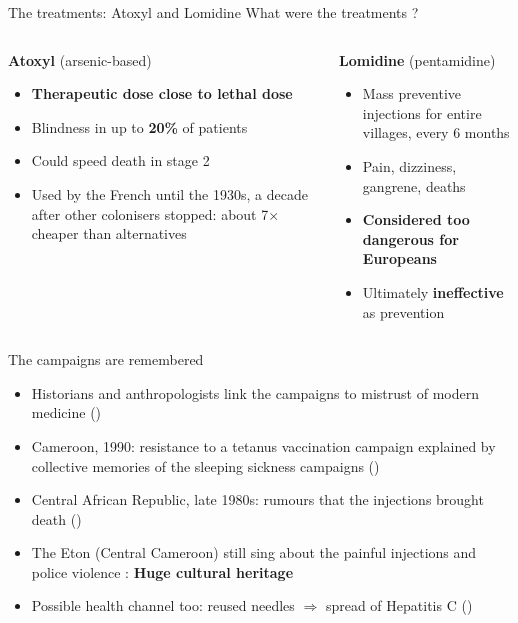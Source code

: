 \documentclass[aspectratio=1610]{beamer}
\newcommand{\highlight}[1]{\textcolor{accent}{\textbf{#1}}}
\newcommand{\refs}[1]{{\footnotesize\color{softgray}(\citealp{#1})}} %
\newcommand{\backupbutton}[2]{\hyperlink{#1}{\beamergotobutton{#2}}}
\begin{document}
\begin{frame}{The treatments: Atoxyl and Lomidine}
\centering
What were the treatments ?
  \begin{columns}[T]
    \begin{column}{0.48\textwidth}
      \textbf{Atoxyl} (arsenic-based)
      \begin{itemize}
        \item \highlight{Therapeutic dose close to lethal dose}
        \item Blindness in up to \highlight{20\%} of patients
        \item Could speed death in stage 2
        \item Used by the French until the 1930s, a decade after other colonisers stopped:
          about 7$\times$ cheaper than alternatives
      \end{itemize}
    \end{column}
    \begin{column}{0.48\textwidth}
      \textbf{Lomidine} (pentamidine)
      \begin{itemize}
        \item Mass preventive injections for entire villages, every 6 months
        \item Pain, dizziness, gangrene, deaths
        \item \highlight{Considered too dangerous for Europeans}
        \item Ultimately \highlight{ineffective} as prevention
      \end{itemize}
    \end{column}
  \end{columns}
\end{frame}

\begin{frame}[label=main-memory]{The campaigns are remembered}
  \begin{itemize}
    \item Historians and anthropologists link the campaigns to mistrust of modern medicine
      \refs{headrick_1994,lachenal_2014}
    \item Cameroon, 1990: resistance to a tetanus vaccination campaign explained by
      collective memories of the sleeping sickness campaigns \refs{feldman_etal_2000}
    \item Central African Republic, late 1980s: rumours that the injections brought death
      \refs{giles_vernick_2002}
    \item The Eton (Central Cameroon) still sing about the painful injections and police violence : \textbf{Huge cultural heritage}
    \item Possible health channel too: reused needles $\Rightarrow$ spread of Hepatitis C
      \refs{pepin_2011} \backupbutton{bk-iatrogenic}{Details}
  \end{itemize}
\end{frame}
\end{document}

